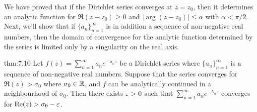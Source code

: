 We have proved that if the Dirichlet series converges at $z = z_0$, then 
it determines an analytic function for $\Re(z-z_0) \geq 0$ and 
$\lvert\arg(z-z_0)\rvert \leq \alpha$ with $\alpha < \pi/2$. Next, we'll 
show that if $\{a_n\}_{n=1}^\infty$ is in addition a sequence of non-negative 
real numbers, then the domain of convergence for the analytic function 
determined by the series is limited only by a singularity on the real axis. 

\begin{theo}{thm:7.10}
    Let $f(z) = \sum_{n=1}^\infty a_n e^{-\lambda_n z}$ be a Dirichlet series 
    where $\{a_n\}_{n=1}^\infty$ is a sequence of non-negative real numbers. 
    Suppose that the series converges for $\Re(z) > \sigma_0$ where $\sigma_0 
    \in \mathbb{R}$, and $f$ can be analytically continued in a neighbourhood of $\sigma_0$. 
    Then there exists $\varepsilon > 0$ such that $\sum_{n=1}^\infty a_n e^{-\lambda_n z}$ 
    converges for ${\rm Re}(z) > \sigma_0 - \varepsilon$. 
\end{theo}
